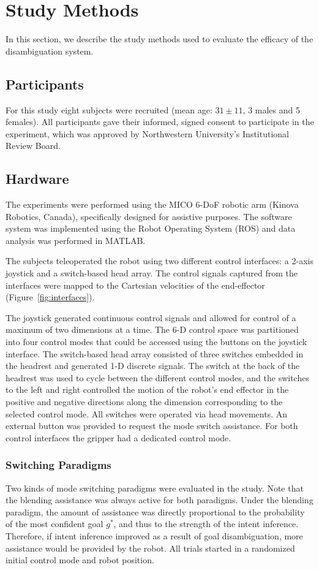 \documentclass[natbib, twocolumn]{svjour3}          %
\begin{document}
\section{Study Methods}\label{sec:ed}
In this section, we describe the study methods used to evaluate the efficacy of the disambiguation system. 
\subsection{Participants}
For this study eight subjects were recruited (mean age: $31 \pm 11$, 3 males and 5 females). All participants gave their informed, signed consent to participate in the experiment, which was approved by Northwestern University's Institutional Review Board.
\subsection{Hardware}\label{ssec:hardware}
The experiments were performed using the MICO 6-DoF robotic arm (Kinova Robotics, Canada), specifically designed for assistive purposes. The software system was implemented using the Robot Operating System (ROS) and data analysis was performed in MATLAB. 


The subjects teleoperated the robot using two different control interfaces: a 2-axis joystick and a switch-based head array. The control signals captured from the interfaces were mapped to the Cartesian velocities of the end-effector (Figure~\ref{fig:interfaces}).

The joystick generated continuous control signals and allowed for control of a maximum of two dimensions at a time. The 6-D control space was partitioned into four control modes that could be accessed using the buttons on the joystick interface. The switch-based head array consisted of three switches embedded in the headrest and generated 1-D discrete signals. The switch at the back of the headrest was used to cycle between the different control modes, and the switches to the left and right controlled the motion of the robot's end effector in the positive and negative directions along the dimension corresponding to the selected control mode. All switches were operated via head movements.
An external button was provided to request the mode switch assistance. For both control interfaces the gripper had a dedicated control mode. 

\subsubsection{Switching Paradigms}
Two kinds of mode switching paradigms were evaluated in the study. Note that the blending assistance was always active for both paradigms. Under the blending paradigm, the amount of assistance was directly proportional to the probability of the most confident goal $g^*$, and thus to the strength of the intent inference. Therefore, if intent inference improved as a result of goal disambiguation, more assistance would be provided by the robot. All trials started in a randomized initial control mode and robot position. 
\end{document}
